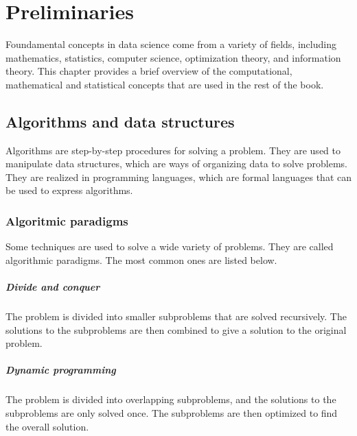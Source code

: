 \chapter{Preliminaries}
\label{chap:preliminaries}


Foundamental concepts in data science come from a variety of fields, including
mathematics, statistics, computer science, optimization theory, and information theory.
This chapter provides a brief overview of the computational, mathematical and statistical
concepts that are used in the rest of the book.

\section{Algorithms and data structures}

Algorithms are step-by-step procedures for solving a problem.  They are used to
manipulate data structures, which are ways of organizing data to solve problems.
They are realized in programming languages, which are formal languages that can be used
to express algorithms.

\subsection{Algoritmic paradigms}

Some techniques are used to solve a wide variety of problems.  They are called
algorithmic paradigms.  The most common ones are listed below.

\paragraph{Divide and conquer}  The problem is divided into smaller subproblems that are
solved recursively.  The solutions to the subproblems are then combined to give a solution
to the original problem.

\paragraph{Dynamic programming}  The problem is divided into overlapping subproblems, and
the solutions to the subproblems are only solved once. The subproblems are then optimized
to find the overall solution.

